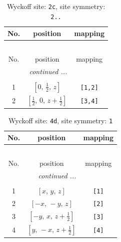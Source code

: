 \documentclass[fleqn,8pt]{jsarticle}
\begin{document}
\renewcommand{\arraystretch}{1.2}
\begin{longtable}{ccc}
\caption{Wyckoff site: {\tt 2c}, site symmetry: {\tt 2..}}
 \\
 \hline \hline
No. & position & mapping \\ \hline \endfirsthead

\multicolumn{2}{l}{\tablename\ \thetable{}} \\
 \hline \hline
No. & position & mapping \\ \hline \endhead

 \hline \hline
\multicolumn{2}{r}{\footnotesize\it continued ...} \\ \endfoot

 \hline \hline
\multicolumn{2}{r}{} \\ \endlastfoot

1 & $\left[ 0,\, \frac{1}{2},\, z \right]$ & {\tt [1,2]} \\ \hline
2 & $\left[ \frac{1}{2},\, 0,\, z + \frac{1}{2} \right]$ & {\tt [3,4]} \\
\end{longtable}
\renewcommand{\arraystretch}{1.2}
\begin{longtable}{ccc}
\caption{Wyckoff site: {\tt 4d}, site symmetry: {\tt 1}}
 \\
 \hline \hline
No. & position & mapping \\ \hline \endfirsthead

\multicolumn{2}{l}{\tablename\ \thetable{}} \\
 \hline \hline
No. & position & mapping \\ \hline \endhead

 \hline \hline
\multicolumn{2}{r}{\footnotesize\it continued ...} \\ \endfoot

 \hline \hline
\multicolumn{2}{r}{} \\ \endlastfoot

1 & $\left[ x,\, y,\, z \right]$ & {\tt [1]} \\ \hline
2 & $\left[ - x,\, - y,\, z \right]$ & {\tt [2]} \\ \hline
3 & $\left[ - y,\, x,\, z + \frac{1}{2} \right]$ & {\tt [3]} \\ \hline
4 & $\left[ y,\, - x,\, z + \frac{1}{2} \right]$ & {\tt [4]} \\
\end{longtable}
\end{document}
